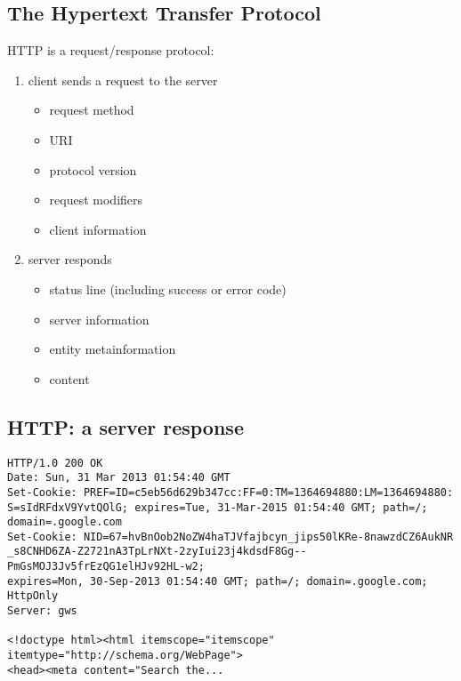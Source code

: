 \documentclass[xga]{xdvislides}
\begin{document}
\subsection{The Hypertext Transfer Protocol}
HTTP is a request/response protocol:
\begin{enumerate}
	\item client sends a request to the server
		\begin{itemize}
			\item request method
			\item URI
			\item protocol version
			\item request modifiers
			\item client information
		\end{itemize}
	\item server responds
		\begin{itemize}
			\item status line (including success or error code)
			\item server information
			\item entity metainformation
			\item content
		\end{itemize}
\end{enumerate}

\subsection{HTTP: a server response}
\begin{verbatim}
HTTP/1.0 200 OK
Date: Sun, 31 Mar 2013 01:54:40 GMT
Set-Cookie: PREF=ID=c5eb56d629b347cc:FF=0:TM=1364694880:LM=1364694880:
S=sIdRFdxV9YvtQOlG; expires=Tue, 31-Mar-2015 01:54:40 GMT; path=/;
domain=.google.com
Set-Cookie: NID=67=hvBnOob2NoZW4haTJVfajbcyn_jips50lKRe-8nawzdCZ6AukNR
_s8CNHD6ZA-Z2721nA3TpLrNXt-2zyIui23j4kdsdF8Gg--PmGsMOJ3Jv5frEzQG1elHJv92HL-w2;
expires=Mon, 30-Sep-2013 01:54:40 GMT; path=/; domain=.google.com; HttpOnly
Server: gws

<!doctype html><html itemscope="itemscope" itemtype="http://schema.org/WebPage">
<head><meta content="Search the...

\end{verbatim}
\end{document}
